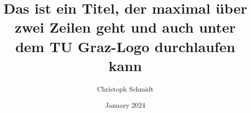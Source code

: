 \documentclass[final]{beamer}
\title{Das ist ein Titel, der maximal über zwei Zeilen geht und auch unter dem TU Graz-Logo durchlaufen kann}
\author{Christoph Schmidt}
\institute{Institute of Electrical Measurement and Sensor Systems}
\date{January 2024}
\begin{document}
\begin{frame}[t]
    
    
\end{frame}
\end{document}
